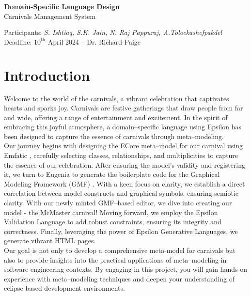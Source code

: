 \documentclass[a4paper,11pt]{report}
\begin{document}

\begin{center}
	{\bf Domain-Specific Language Design}\\
	Carnivals Management System
\end{center}
\begin{center}
	Participants: {\it S. Ishtiaq, S.K. Jain, N. Raj Pappuraj, A.Toloekashefpakdel}\\
	\vspace{0.2 cm}
	{\small Deadline: $10^{\text{th}}$ April 2024 -- Dr. Richard Paige}
\end{center}
\vspace{0.5 cm}

\section{Introduction}
Welcome to the world of the carnivals, a vibrant celebration that captivates hearts and sparks joy. Carnivals are festive gatherings that draw people from far and wide, offering a range of entertainment and excitement. In the spirit of embracing this joyful atmosphere, a domain--specific language using Epsilon has been designed to capture the essence of carnivals through meta--modeling.\\

Our journey begins with designing the ECore \cite{4} meta--model for our carnival using Emfatic \cite{3}, carefully selecting classes, relationships, and multiplicities to capture the essence of our celebration. After ensuring the model's validity and registering it, we turn to Eugenia to generate the boilerplate code for the Graphical Modeling Framework (GMF) \cite{6}. With a keen focus on clarity, we establish a direct correlation between model constructs and graphical symbols, ensuring semiotic clarity. With our newly minted GMF--based editor, we dive into creating our model - the McMaster carnival! Moving forward, we employ the Epsilon Validation Language to add robust constraints, ensuring its integrity and correctness. Finally, leveraging the power of Epsilon Generative Languages, we generate vibrant HTML pages.\\

Our goal is not only to develop a comprehensive meta-model for carnivals but also to provide insights into the practical applications of meta--modeling in software engineering contexts. By engaging in this project, you will gain hands-on experience with meta--modeling techniques and deepen your understanding of eclipse based development environments.
\end{document}
